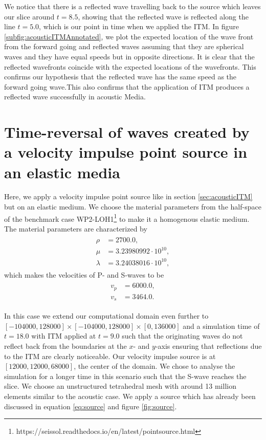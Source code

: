 We notice that there is a reflected wave travelling back to the source which leaves our slice around $t=8.5$, showing that the reflected wave
is reflected along the line $t=5.0$, which is our point in time when we applied the \ac{ITM}. In figure \ref{subfig:acousticITMAnnotated}, we plot the expected
location of the wave front from the forward going and reflected waves assuming that they are spherical waves and they have equal speeds but in opposite directions. 
It is clear that the reflected wavefronts coincide with the expected locations of the wavefronts. This confirms our hypothesis that the reflected wave has the same speed
as the forward going wave.This also confirms that the application of \ac{ITM} produces a reflected wave successfully in acoustic Media.

\section{Time-reversal of waves created by a velocity impulse point source in an elastic media} \label{sec:elasticITM}
Here, we apply a velocity impulse point source like in section \ref{sec:acousticITM} but on an elastic medium. We choose the material parameters from the half-space of the 
benchmark case WP2-LOH1\footnote[1]{https://seissol.readthedocs.io/en/latest/pointsource.html} to make it a homogenous elastic medium. The material parameters 
are characterized by
\begin{align}
    \begin{split}
        \rho &=    2700.0 ,\\
        \mu &=     3.23980992 \cdot 10^{10} ,\\
        \lambda &= 3.24038016 \cdot 10^{10} ,
    \end{split}
\end{align}
which makes the velocities of P- and S-waves to be
\begin{align}
    \begin{split}
        v_p &= 6000.0 ,\\
        v_s &= 3464.0 .
    \end{split}
\end{align}

In this case we extend our computational domain even further to $\left[-104000,128000\right] \times \left[-104000,128000\right] \times \left[0,136000\right]$ and a simulation time of $t=18.0$ with \ac{ITM} applied at $t=9.0$
such that the originating waves do not reflect back from the boundaries at the $x$- and $y$-axis ensuring that reflections due to the \ac{ITM} are clearly noticeable.
Our velocity impulse source is at $\left[12000,12000,68000\right]$, the center of the domain.
We chose to analyse the simulation for a longer time in this scenario such that the S-wave reaches the slice. We choose an unstructured tetrahedral mesh with around 13 million elements similar to the acoustic case. 
We apply a source which has already been discussed in equation \ref{eq:source} and figure \ref{fig:source}.

